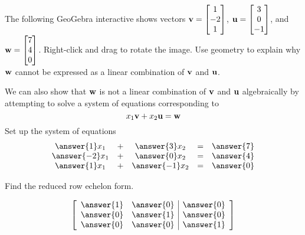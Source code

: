 \documentclass{ximera}
\begin{document}
\begin{problem}
\begin{problem}\label{prob:lincombtwovectors4b}
The following GeoGebra interactive shows vectors ${\bf v}=\begin{bmatrix}1\\-2\\1\end{bmatrix}$, ${\bf u}=\begin{bmatrix}3\\0\\-1\end{bmatrix}$, and ${\bf w}=\begin{bmatrix}7\\4\\0\end{bmatrix}$. Right-click and drag to rotate the image.  Use geometry to explain why ${\bf w}$ cannot be expressed as a linear combination of ${\bf v}$ and ${\bf u}$.

\begin{center} 
\end{center}

We can also show that ${\bf w}$ is not a linear combination of ${\bf v}$ and ${\bf u}$ algebraically by attempting to solve a system of equations corresponding to 
$$x_1{\bf v}+x_2{\bf u}={\bf w}$$
Set up the system of equations
$$\begin{array}{ccccccc}
      \answer{1}x_1 & +&\answer{3}x_2&= &\answer{7} \\
	 \answer{-2}x_1& +&\answer{0}x_2&=&\answer{4}\\
     \answer{1}x_1& +&\answer{-1}x_2&=&\answer{0}
    \end{array}$$

Find the reduced row echelon form.

$$\left[\begin{array}{cc|c} 
 \answer{1}&\answer{0}&\answer{0}\\\answer{0}&\answer{1}&\answer{0}\\\answer{0}&\answer{0}&\answer{1}
 \end{array}\right]$$

\end{problem}

\end{problem}
\end{document}
